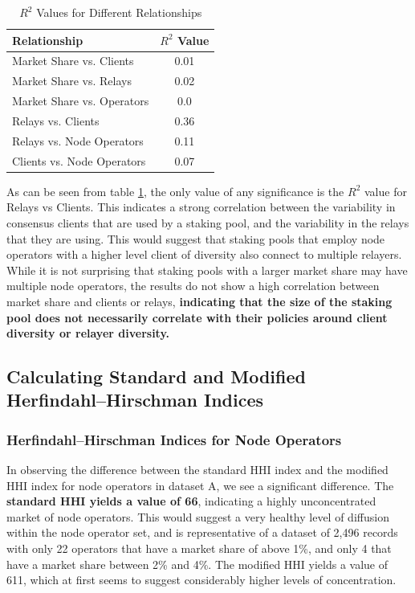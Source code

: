 \documentclass[conference]{IEEEtran}
\begin{document}
\begin{table}[htbp]
    \centering
    \normalsize
    \renewcommand{\arraystretch}{1.2}
    \begin{tabular}{|p{6cm}|c|}
        \hline
        \textbf{Relationship} & \textbf{$R^2$ Value} \\
        \hline
        Market Share vs. Clients & 0.01 \\ \hline
        Market Share vs. Relays & 0.02 \\ \hline
        Market Share vs. Operators & 0.0 \\ \hline
        Relays vs. Clients & 0.36 \\ \hline
        Relays vs. Node Operators & 0.11 \\ \hline
        Clients vs. Node Operators & 0.07 \\ \hline
    \end{tabular}
    \vspace{10pt}
    \caption{$R^2$ Values for Different Relationships}
    \label{tab:r2-value-staking-pools}
\end{table}

As can be seen from table \ref{tab:r2-value-staking-pools}, the only value of any significance is the $R^2$ value for Relays vs Clients.  This indicates a strong correlation between the variability in consensus clients that are used by a staking pool, and the variability in the relays that they are using.  This would suggest that staking pools that employ node operators with a higher level client of diversity also connect to multiple relayers.  While it is not surprising that staking pools with a larger market share may have multiple node operators, the results do not show a high correlation between market share and clients or relays, \textbf{indicating that the size of the staking pool does not necessarily correlate with their policies around client diversity or relayer diversity.}

\subsection{Calculating Standard and Modified Herfindahl–Hirschman Indices}

\subsubsection{Herfindahl–Hirschman Indices for Node Operators}

In observing the difference between the standard HHI index and the modified HHI index for node operators in dataset A, we see a significant difference.  The \textbf{standard HHI yields a value of 66}, indicating a highly unconcentrated market of node operators.  This would suggest a very healthy level of diffusion within the node operator set, and is representative of a dataset of 2,496 records with only 22 operators that have a market share of above 1\%, and only 4 that have a market share between 2\% and 4\%.  The modified HHI yields a value of 611, which at first seems to suggest considerably higher levels of concentration.
\end{document}
